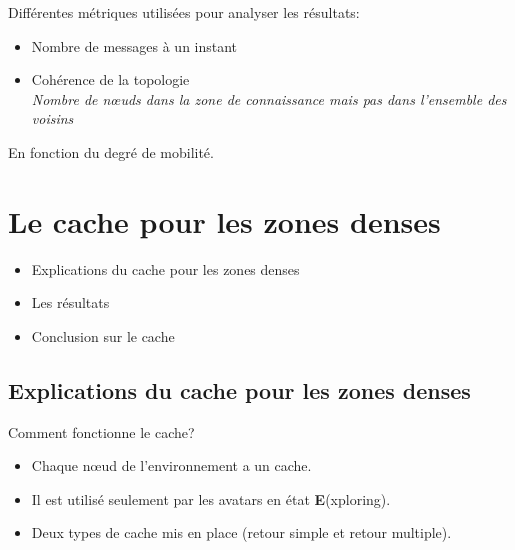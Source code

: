 \documentclass{beamer}
\begin{document}
  \begin{frame}
	Différentes métriques utilisées pour analyser les résultats:
	\begin{itemize}
		\item Nombre de messages à un instant 
		\item Cohérence de la topologie \\ \textit{\footnotesize{Nombre de nœuds dans la zone de connaissance mais pas dans l'ensemble des voisins}}
	\end{itemize}
	\vspace{5mm}
	En fonction du degré de mobilité.
  \end{frame}

  \section{Le cache pour les zones denses}
  \begin{frame}
	\vspace{1cm}
	\begin{itemize}
		\item Explications du cache pour les zones denses
		\item Les résultats 
		\item Conclusion sur le cache
	\end{itemize}
  \end{frame}
  
  \subsection{Explications du cache pour les zones denses}
  \begin{frame}
	Comment fonctionne le cache?
	\begin{itemize}
 		\item Chaque nœud de l'environnement a un cache.
		\item Il est utilisé seulement par les avatars en état \textbf{E}(xploring).
		\item Deux types de cache mis en place (retour simple et retour multiple).
	\end{itemize}
  \end{frame}
\end{document}
